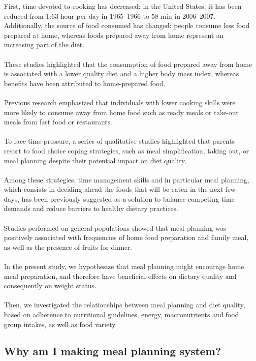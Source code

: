 First, time devoted to cooking has decreased: in the United States, it has been reduced from 1:63 hour per day in 1965–1966 to 58 min in 2006–2007. Additionally, the source of food consumed has changed: people consume less food prepared at home, whereas foods prepared away from home represent an increasing part of the diet. \\ \\
These studies highlighted that the consumption of food prepared away from home is associated with a lower quality diet and a higher body mass index, whereas benefits have been attributed to home-prepared food. \\ \\
Previous research emphasized that individuals with lower cooking skills were more likely to consume away from home food such as ready meals or take-out meals from fast food or restaurants. \\ \\
To face time pressure, a series of qualitative studies highlighted that parents resort to food choice coping strategies, such as meal simplification, taking out, or meal planning despite their potential impact on diet quality. \\ \\
Among these strategies, time management skills and in particular meal planning, which consists in deciding ahead the foods that will be eaten in the next few days, has been previously suggested as a solution to balance competing time demands and reduce barriers to healthy dietary practices. \\ \\
Studies performed on general populations showed that meal planning was positively associated with frequencies of home food preparation and family meal, as well as the presence of fruits for dinner. \\ \\
In the present study, we hypothesize that meal planning might encourage home meal preparation, and therefore have beneficial effects on dietary quality and consequently on weight status. \\  \\
Then, we investigated the relationships between meal planning and diet quality, based on adherence to nutritional guidelines, energy, macronutrients and food group intakes, as well as food variety.

\subsection{Why am I making meal planning system?}

